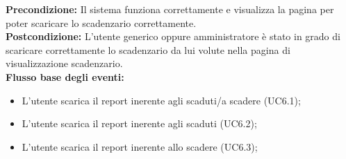 \textbf{Precondizione:}  Il sistema funziona correttamente e visualizza la pagina per poter scaricare lo scadenzario correttamente. \\

\textbf{Postcondizione:} L’utente generico oppure amministratore è stato in grado di scaricare correttamente lo scadenzario da lui volute nella pagina di visualizzazione scadenzario.  \\


\textbf{Flusso base degli eventi:} 

\begin{itemize}
\item L’utente scarica il report inerente agli scaduti/a scadere (UC6.1);
\item L’utente scarica il report inerente agli scaduti  (UC6.2);
\item L’utente scarica il report inerente allo scadere (UC6.3);
\end{itemize}



